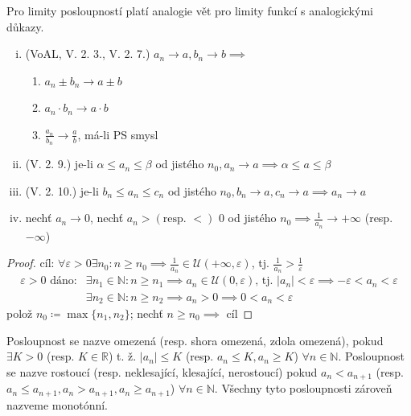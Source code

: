 \begin{poznamka}
  Pro limity posloupností platí analogie vět pro limity funkcí s analogickými důkazy.
  \begin{enumerate}[i.]
    \item (VoAL, V. 2. 3., V. 2. 7.) $a_n \to a, b_n \to b \implies$ \begin{enumerate}[1.]
      \item $a_n \pm b_n \to a \pm b$
      \item $a_n \cdot b_n \to a \cdot b$
     \item $\frac{a_n}{b_n} \to \frac{a}{b}$, má-li PS smysl
    \end{enumerate}
    \item (V. 2. 9.) je-li $\alpha \leq a_n \leq \beta$ od jistého $n_0, a_n \to a \implies \alpha \leq a \leq \beta$
    \item (V. 2. 10.) je-li $b_n \leq a_n \leq c_n$ od jistého $n_0, b_n \to a, c_n \to a \implies a_n \to a$
    \item nechť $a_n \to 0$, nechť $a_n > (\text{resp. } <)$ $ 0$ od jistého $n_0 \implies \frac{1}{a_n} \to +\infty$ (resp. $-\infty$)
  \end{enumerate}
\end{poznamka}

\begin{proof}
  cíl: $\forall \varepsilon > 0 \exists n_0: n \geq n_0 \implies \frac{1}{a_n} \in \mathscr U(+\infty, \varepsilon)$, tj. $\frac{1}{a_n} > \frac{1}{\varepsilon}$
  \begin{align*}
    \varepsilon >0\text{ dáno:}&\exists n_1 \in \mathbb N: n \geq n_1 \implies a_n \in \mathscr U(0, \varepsilon)\text{, tj. }|a_n|<\varepsilon \implies -\varepsilon < a_n < \varepsilon\\
    &\exists n_2 \in \mathbb N: n \geq n_2 \implies a_n > 0 \implies 0 < a_n < \varepsilon
  \end{align*}
  polož $n_0 \coloneq \max \{n_1, n_2\}$; nechť $n\geq n_0 \implies$ cíl
\end{proof}

\begin{definice}
  Posloupnost se nazve omezená (resp. shora omezená, zdola omezená), pokud $\exists K > 0$ (resp. $K \in \mathbb R$) t. ž. $|a_n| \leq K$ (resp. $a_n \leq K, a_n \geq K$) $\forall n \in \mathbb N$. Posloupnost se nazve rostoucí (resp. neklesající, klesající, nerostoucí) pokud $a_n < a_{n+1}$ (resp. $a_n \leq a_{n+1}, a_n > a_{n+1}, a_n \geq a_{n+1}$) $\forall n \in \mathbb N$. Všechny tyto posloupnosti zároveň nazveme monotónní.
\end{definice}

